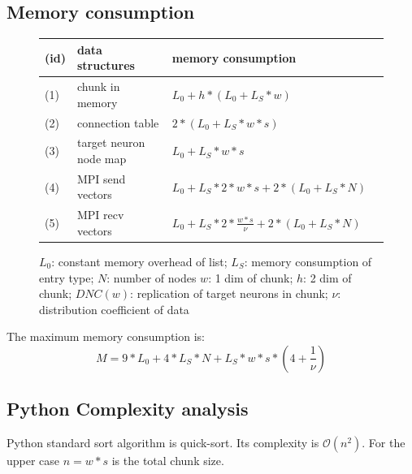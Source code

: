 \documentclass[a4paper]{article}
\begin{document}
\subsection{Memory consumption}
\begin{figure}[h]
\begin{tabular}{| l | l | l | l |}
    \hline
    (id) & data structures & memory consumption \\ \hline
    (1) & chunk in memory & $L_0 + h*(L_0 + L_S*w)$ \\ \hline
    (2) & connection table & $2*(L_0+L_S*w*s)$ \\ \hline
    (3) & target neuron node map & $L_0+L_S*w*s$ \\ \hline
    (4) & MPI send vectors & $L_0+L_S*2*w*s+2*(L_0+L_S*N)$ \\ \hline
    (5) & MPI recv vectors & $L_0+L_S*2*\frac{w*s}{\nu}+2*(L_0+L_S*N)$ \\ \hline
    \end{tabular}
\caption{$L_0$: constant memory overhead of list; $L_S$: memory consumption of entry type; $N$: number of nodes $w$: 1 dim of chunk; $h$: 2 dim of chunk; $DNC(w)$: replication of target neurons in chunk; $\nu$: distribution coefficient of data}
\end{figure}
The maximum memory consumption is:
\begin{equation}
  M = 9*L_0 + 4*L_S*N+L_S*w*s*(4+\frac{1}{\nu})
  \label{eq:maxmemoryconsumption}
\end{equation}


\subsection{Python Complexity analysis}
Python standard sort algorithm is quick-sort.
Its complexity is $\mathcal{O}(n^2)$.
For the upper case $n=w*s$ is the total chunk size.
\end{document}
